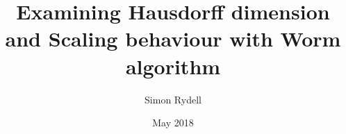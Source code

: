 \documentclass[nocoverpage,swedish,g5paper]{thesis}
\title{Examining Hausdorff dimension and Scaling behaviour with Worm algorithm}
\author{Simon Rydell}
\date{May 2018}
\begin{document}

\begin{abstract}






 


\end{abstract}
\end{document}
